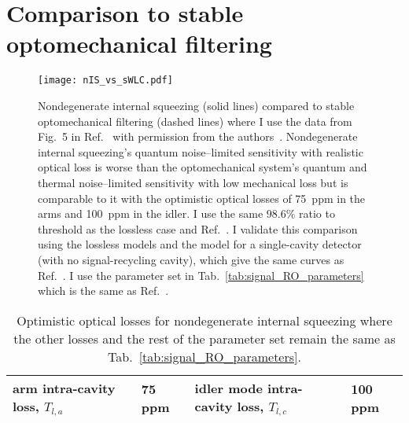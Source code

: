 
\section{Comparison to stable optomechanical filtering} %
\label{sec:nIS_vs_sWLC}

\begin{figure}
	\centering
	\texttt{[image: nIS\_vs\_sWLC.pdf]}
	\caption{Nondegenerate internal squeezing (solid lines) compared to stable optomechanical filtering (dashed lines) where I use the data from Fig.~5 in Ref.~\cite{liBroadbandSensitivityImprovement2020} with permission from the authors~\cite{xiangLiPersonalCommunication}. Nondegenerate internal squeezing's quantum noise--limited sensitivity with realistic optical loss is worse than the optomechanical system's quantum and thermal noise--limited sensitivity with low mechanical loss but is comparable to it with the optimistic optical losses of 75~ppm in the arms and 100~ppm in the idler. I use the same $98.6\%$ ratio to threshold as the lossless case and Ref.~\cite{liBroadbandSensitivityImprovement2020}. I validate this comparison using the lossless models and the model for a single-cavity detector (with no signal-recycling cavity), which give the same curves as Ref.~\cite{liBroadbandSensitivityImprovement2020}. I use the parameter set in Tab.~\ref{tab:signal_RO_parameters} which is the same as Ref.~\cite{liBroadbandSensitivityImprovement2020}.}
	\label{fig:nIS_vs_sWLC}
\end{figure}

\begin{table}[]
\centering
\begin{tabular}{@{}ll|ll@{}}
\toprule
arm intra-cavity loss, $T_{l,a}$ & 75 ppm & idler mode intra-cavity loss, $T_{l,c}$ & 100 ppm \\ \bottomrule
\end{tabular}
\caption{Optimistic optical losses for nondegenerate internal squeezing where the other losses and the rest of the parameter set remain the same as Tab.~\ref{tab:signal_RO_parameters}.}
\label{tab:ideal_loss}
\end{table}


